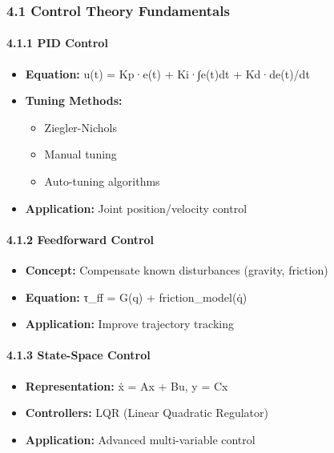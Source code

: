 \documentclass[
]{article}
\providecommand{\tightlist}{%
  \setlength{\itemsep}{0pt}\setlength{\parskip}{0pt}}
\begin{document}
\hypertarget{control-theory-fundamentals}{%
\subsubsection{4.1 Control Theory
Fundamentals}\label{control-theory-fundamentals}}

\hypertarget{pid-control}{%
\paragraph{4.1.1 PID Control}\label{pid-control}}

\begin{itemize}
\tightlist
\item
  \textbf{Equation:} u(t) = Kp·e(t) + Ki·∫e(t)dt + Kd·de(t)/dt
\item
  \textbf{Tuning Methods:}

  \begin{itemize}
  \tightlist
  \item
    Ziegler-Nichols
  \item
    Manual tuning
  \item
    Auto-tuning algorithms
  \end{itemize}
\item
  \textbf{Application:} Joint position/velocity control
\end{itemize}

\hypertarget{feedforward-control}{%
\paragraph{4.1.2 Feedforward Control}\label{feedforward-control}}

\begin{itemize}
\tightlist
\item
  \textbf{Concept:} Compensate known disturbances (gravity, friction)
\item
  \textbf{Equation:} τ\_ff = G(q) + friction\_model(q̇)
\item
  \textbf{Application:} Improve trajectory tracking
\end{itemize}

\hypertarget{state-space-control}{%
\paragraph{4.1.3 State-Space Control}\label{state-space-control}}

\begin{itemize}
\tightlist
\item
  \textbf{Representation:} ẋ = Ax + Bu, y = Cx
\item
  \textbf{Controllers:} LQR (Linear Quadratic Regulator)
\item
  \textbf{Application:} Advanced multi-variable control
\end{itemize}
\end{document}
